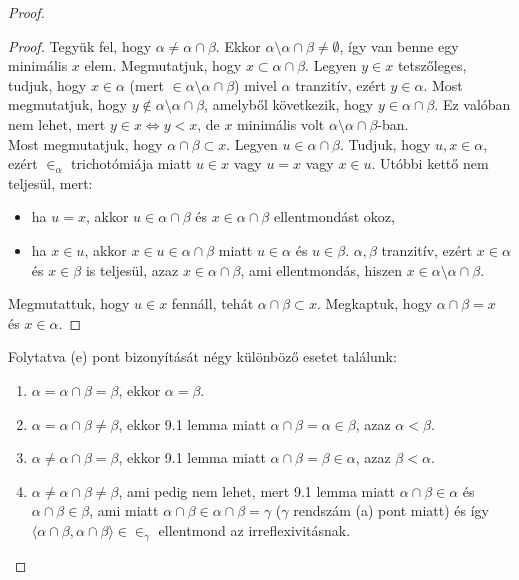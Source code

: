 \begin{proof}
\begin{lem}
\end{lem}
\begin{proof} Tegyük fel, hogy $\alpha \neq \alpha \cap \beta$. Ekkor $\alpha \setminus \alpha \cap \beta \neq \emptyset$, így van benne egy minimális $x$ elem. Megmutatjuk, hogy $x \subset \alpha \cap \beta$. Legyen $y \in x$ tetszőleges, tudjuk, hogy $x \in \alpha$ (mert $\in \alpha \setminus \alpha \cap \beta$) mivel $\alpha$ tranzitív, ezért $y \in \alpha$. Most megmutatjuk, hogy $y \not\in \alpha \setminus \alpha \cap \beta$, amelyből következik, hogy $y \in \alpha \cap \beta$. Ez valóban nem lehet, mert $y \in x \Leftrightarrow y < x$, de $x$ minimális volt $\alpha \setminus \alpha \cap \beta$-ban. \\
\indent Most megmutatjuk, hogy $\alpha \cap \beta \subset x$. Legyen $u \in \alpha \cap \beta$. Tudjuk, hogy $u,x \in \alpha$, ezért $\in_\alpha$ trichotómiája miatt $u \in x$ vagy $u = x$ vagy $x \in u$. Utóbbi kettő nem teljesül, mert:
\begin{itemize}
\item ha $u=x$, akkor $u \in \alpha \cap \beta$ és $x \in \alpha \cap \beta$ ellentmondást okoz,
\item ha $x \in u$, akkor $x \in u \in \alpha \cap \beta$ miatt $u \in \alpha$ és $u \in \beta$. $\alpha, \beta$ tranzitív, ezért $x \in \alpha$ és $x \in \beta$ is teljesül, azaz $x \in \alpha \cap \beta$, ami ellentmondás, hiszen $x \in \alpha \setminus \alpha \cap \beta$.
\end{itemize}
Megmutattuk, hogy $u \in x$ fennáll, tehát $\alpha \cap \beta \subset x$. Megkaptuk, hogy $\alpha \cap \beta = x$ és $x \in \alpha$.
\end{proof}
Folytatva (e) pont bizonyítását négy különböző esetet találunk:
\begin{enumerate}
\item $\alpha = \alpha \cap \beta = \beta$, ekkor $\alpha = \beta$.
\item $\alpha = \alpha \cap \beta \neq \beta$, ekkor 9.1 lemma miatt $\alpha \cap \beta = \alpha \in \beta$, azaz $\alpha < \beta$.
\item $\alpha \neq \alpha \cap \beta = \beta$, ekkor 9.1 lemma miatt $\alpha \cap \beta = \beta \in \alpha$, azaz $\beta < \alpha$.
\item $\alpha \neq \alpha \cap \beta \neq \beta$, ami pedig nem lehet, mert 9.1 lemma miatt $\alpha \cap \beta \in \alpha$ és $\alpha \cap \beta \in \beta$, ami miatt $\alpha \cap \beta \in \alpha \cap \beta = \gamma$ ($\gamma$ rendszám (a) pont miatt) és így $\langle \alpha \cap \beta, \alpha \cap \beta \rangle \in \in_\gamma$ ellentmond az irreflexivitásnak.

\end{enumerate}
\end{proof}
